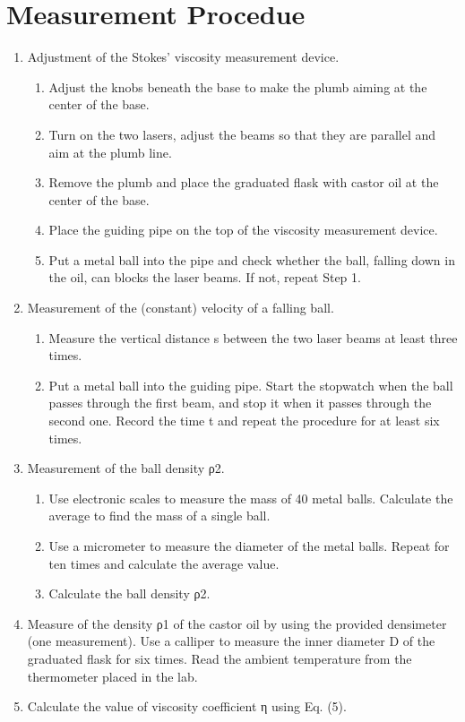 \section{Measurement Procedue}


\begin{enumerate}
\item Adjustment of the Stokes’ viscosity measurement device.

\begin{enumerate}
\item Adjust the knobs beneath the base to make the plumb aiming at the center of the base.
\item Turn on the two lasers, adjust the beams so that they are parallel and aim at the plumb line.
\item Remove the plumb and place the graduated flask with castor oil at the center of the base.
\item Place the guiding pipe on the top of the viscosity measurement device.
\item Put a metal ball into the pipe and check whether the ball, falling down in
  the oil, can blocks the laser beams. If not, repeat Step 1.
\end{enumerate}

\item Measurement of the (constant) velocity of a falling ball.

\begin{enumerate}
\item Measure the vertical distance s between the two laser beams at least three
  times. 
\item Put a metal ball into the guiding pipe. Start the stopwatch when the ball 
  passes through the first beam, and stop it when it passes through the second
  one. Record the time t and repeat the procedure for at least six times. 
\end{enumerate}

\item Measurement of the ball density ρ2.

\begin{enumerate}
\item Use electronic scales to measure the mass of 40 metal balls. Calculate the
  average to find the mass of a single ball. 
\item Use a micrometer to measure the diameter of the metal balls. Repeat for
  ten times and calculate the average value. 
\item Calculate the ball density ρ2.
\end{enumerate}

\item Measure of the density ρ1 of the castor oil by using the provided
  densimeter (one measurement). Use a calliper to measure the inner diameter D
  of the graduated flask for six times. Read the ambient temperature from the
  thermometer placed in the lab. 
\item Calculate the value of viscosity coefficient η using Eq. (5).

\end{enumerate}

